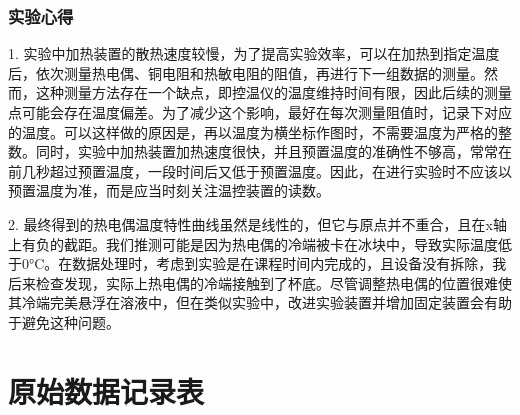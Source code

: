 \documentclass[zihao=5, UTF8]{article}
\theoremstyle{MyLineTheoremStyle} %
\theoremstyle{MyBlockTheoremStyle} %
\theoremstyle{MySubsubsectionStyle} %
\begin{document}
\subsubsection{实验心得}


1. 实验中加热装置的散热速度较慢，为了提高实验效率，可以在加热到指定温度后，依次测量热电偶、铜电阻和热敏电阻的阻值，再进行下一组数据的测量。然而，这种测量方法存在一个缺点，即控温仪的温度维持时间有限，因此后续的测量点可能会存在温度偏差。为了减少这个影响，最好在每次测量阻值时，记录下对应的温度。可以这样做的原因是，再以温度为横坐标作图时，不需要温度为严格的整数。同时，实验中加热装置加热速度很快，并且预置温度的准确性不够高，常常在前几秒超过预置温度，一段时间后又低于预置温度。因此，在进行实验时不应该以预置温度为准，而是应当时刻关注温控装置的读数。

2. 最终得到的热电偶温度特性曲线虽然是线性的，但它与原点并不重合，且在x轴上有负的截距。我们推测可能是因为热电偶的冷端被卡在冰块中，导致实际温度低于0°C。在数据处理时，考虑到实验是在课程时间内完成的，且设备没有拆除，我后来检查发现，实际上热电偶的冷端接触到了杯底。尽管调整热电偶的位置很难使其冷端完美悬浮在溶液中，但在类似实验中，改进实验装置并增加固定装置会有助于避免这种问题。

\section{原始数据记录表}

\end{document}
